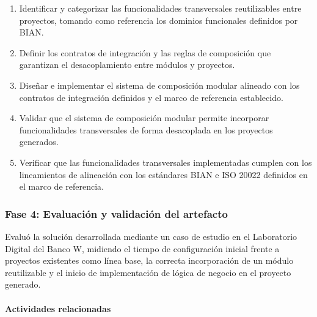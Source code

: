 \begin{enumerate}
    \item Identificar y categorizar las funcionalidades transversales reutilizables entre proyectos, tomando como referencia los dominios funcionales definidos por BIAN.

    \item Definir los contratos de integración y las reglas de composición que garantizan el desacoplamiento entre módulos y proyectos.

    \item Diseñar e implementar el sistema de composición modular alineado con los contratos de integración definidos y el marco de referencia establecido.

    \item Validar que el sistema de composición modular permite incorporar funcionalidades transversales de forma desacoplada en los proyectos generados.

    \item Verificar que las funcionalidades transversales implementadas cumplen con los lineamientos de alineación con los estándares BIAN e ISO 20022 definidos en el marco de referencia.
\end{enumerate}

\subsubsection*{Fase 4: Evaluación y validación del artefacto}

Evaluó la solución desarrollada mediante un caso de estudio en el Laboratorio Digital del Banco W, midiendo el tiempo de configuración inicial frente a proyectos existentes como línea base, la correcta incorporación de un módulo reutilizable y el inicio de implementación de lógica de negocio en el proyecto generado.

\paragraph*{Actividades relacionadas}

